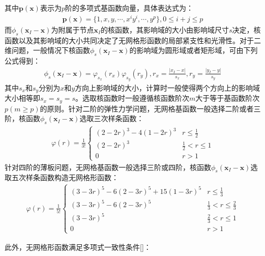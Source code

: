 其中$\pmb{p}(\pmb{x})$表示为$p$阶的多项式基函数向量，具体表达式为：
\begin{equation}
\begin{split}
    \pmb{p}(\pmb{x})=\{1,x,y,\dotsb,x^iy^i,\dotsb,y^p\},0\le i+j \le p
\end{split}
\end{equation}
而$\phi_s(\pmb{x}_I-\pmb{x})$为附属于节点$\pmb{x}_I$的核函数，其影响域的大小由影响域尺寸$s$决定，核函数以及其影响域的大小共同决定了无网格形函数的局部紧支性和光滑性。对于二维问题，一般情况下核函数$\phi_s(\pmb{x}_I-\pmb{x})$的影响域为圆形域或者矩形域，可由下列公式得到：
\begin{equation}
\begin{split}
    \phi_s(\pmb{x}_I-\pmb{x})=\varphi_{s_x}(r_x)\varphi_{s_y}(r_y),r_x=\frac{\lvert x_I-x\rvert}{s_x},r_y=\frac{\lvert y_I-y \rvert}{s_y}
\end{split}
\end{equation}
其中$s_x$和$s_y$分别为$x$和$y$方向上影响域的大小，计算时一般使得两个方向上的影响域大小相等即$s_x=s_y=s$。选取核函数时一般遵循核函数阶次$m$大于等于基函数阶次$p(m\ge p)$的原则。针对二阶的弹性力学问题，无网格基函数一般选择二阶或者三阶，核函数$\phi_s(\pmb{x}_I-\pmb{x})$选取三次样条函数：
\begin{equation}
\begin{split}
    \varphi(r)=\frac{1}{3!}
\begin{cases}
    (2-2r)^3-4(1-2r)^3 &r\le \frac{1}{2}\\
    (2-2r)^3&\frac{1}{2}<r\le 1\\
    0&r>1
\end{cases}
\end{split}
\end{equation}
针对四阶的薄板问题，无网格基函数一般选择三阶或四阶，核函数$\phi_s(\pmb{x}_I-\pmb{x})$选取五次样条函数构造无网格形函数：
\begin{equation}
\begin{split}
        \varphi(r)=\frac{1}{5!}
\begin{cases}
        (3-3r)^5-6(2-3r)^5+15(1-3r)^5&r\le\frac{1}{3}\\
        (3-3r)^5-6(2-3r)^5&\frac{1}{3}<r\le\frac{2}{3}\\
        (3-3r)^5&\frac{2}{3}<r\le1\\
        0&r>1
\end{cases}
\end{split}
\end{equation}\par
此外，无网格形函数满足多项式一致性条件[]：
